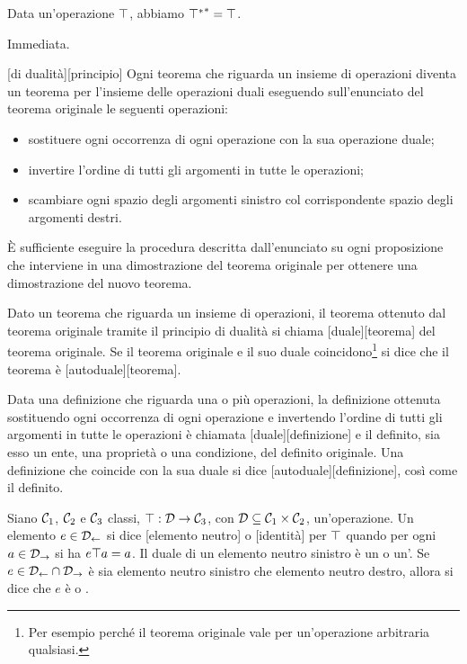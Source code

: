 \begin{Theorem}
	Data un'operazione $\top$, abbiamo ${{{{\top}^*}}^*} = \top$.
\end{Theorem}
\Proof Immediata. \EndProof
\begin{Principle}
	[di dualit\`a][principio] Ogni teorema che riguarda un insieme di operazioni diventa un teorema per l'insieme delle operazioni duali eseguendo sull'enunciato del teorema originale le seguenti operazioni:
	\begin{itemize}
		\item sostituere ogni occorrenza di ogni operazione con la sua operazione duale;
		\item invertire l'ordine di tutti gli argomenti in tutte le operazioni;
		\item scambiare ogni spazio degli argomenti sinistro col corrispondente spazio degli argomenti destri.
	\end{itemize}
\end{Principle}
\Proof \`E sufficiente eseguire la procedura descritta dall'enunciato su ogni proposizione che interviene in una dimostrazione del teorema originale per ottenere una dimostrazione del nuovo teorema. \EndProof
\begin{Definition}
	Dato un teorema che riguarda un insieme di operazioni, il teorema ottenuto dal teorema originale tramite il principio di dualit\`a si chiama [duale][teorema] del teorema originale. Se il teorema originale e il suo duale coincidono\footnote{Per esempio perch\'e il teorema originale vale per un'operazione arbitraria qualsiasi.} si dice che il teorema \`e [autoduale][teorema].
\end{Definition}
\begin{Definition}
	Data una definizione che riguarda una o pi\`u operazioni, la definizione ottenuta sostituendo ogni occorrenza di ogni operazione e invertendo l'ordine di tutti gli argomenti in tutte le operazioni \`e chiamata [duale][definizione] e il definito, sia esso un ente, una propriet\`a o una condizione,  del definito originale. Una definizione che coincide con la sua duale si dice [autoduale][definizione], cos\`i come il definito.
\end{Definition}
\begin{Definition}
	Siano $\mathcal{C}_1$, $\mathcal{C}_2$ e $\mathcal{C}_3$ classi, $\top: \mathcal{D} \rightarrow \mathcal{C}_3$, con $\mathcal{D} \subseteq \mathcal{C}_1 \times \mathcal{C}_2$, un'operazione. Un elemento $e \in \mathcal{D}_\leftarrow$ si dice [elemento neutro] o [identit\`a] per $\top$ quando per ogni $a \in \mathcal{D}_\rightarrow$ si ha $e \top a = a$. Il duale di un elemento neutro sinistro \`e un  o un'. Se $e \in \mathcal{D}_\leftarrow \cap \mathcal{D}_\rightarrow$ \`e sia elemento neutro sinistro che elemento neutro destro, allora si dice che $e$ \`e  o .
\end{Definition}
